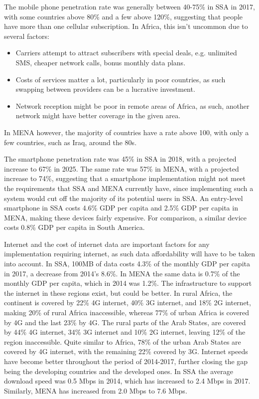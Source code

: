 \documentclass[11pt, a4paper]{article}
\begin{document}
\noindent The mobile phone penetration rate was generally between 40-75\% in SSA in 2017, with some countries above 80\% and a few above 120\%\cite{owidinternet}, suggesting that people have more than one cellular subscription. In Africa, this isn't uncommon due to several factors:
\begin{itemize}
    \item Carriers attempt to attract subscribers with special deals, e.g. unlimited SMS, cheaper network calls, bonus monthly data plans\cite{arwhy}.
    \item Costs of services matter a lot, particularly in poor countries, as such swapping between providers can be a lucrative investment\cite{arwhy}.
    \item Network reception might be poor in remote areas of Africa, as such, another network might have better coverage in the given area\cite{arwhy}.
\end{itemize}
In MENA however, the majority of countries have a rate above 100, with only a few countries, such as Iraq, around the 80s.

 The smartphone penetration rate was 45\% in SSA in 2018, with a projected increase to 67\% in 2025. The same rate was 57\% in MENA, with a projected increase to 74\%\cite{gsmame}, suggesting that a smartphone implementation might not meet the requirements that SSA and MENA currently have, since implementing such a system would cut off the majority of its potential users in SSA. An entry-level smartphone in SSA costs 4.6\% GDP per capita and 2.5\% GDP per capita in MENA, making these devices fairly expensive. For comparison, a similar device costs 0.8\% GDP per capita in South America\cite{gsma}.

Internet and the cost of internet data are important factors for any implementation requiring internet, as such data affordability will have to be taken into account. In SSA, 100MB of data costs 4.3\% of the monthly GDP per capita in 2017, a decrease from 2014's 8.6\%. In MENA the same data is 0.7\% of the monthly GDP per capita, which in 2014 was 1.2\%\cite{gsma}. The infrastructure to support the internet in these regions exist, but could be better. In rural Africa, the continent is covered by 22\% 4G internet, 40\% 3G internet, and 18\% 2G internet, making 20\% of rural Africa inaccessible, whereas 77\% of urban Africa is covered by 4G and the last 23\% by 4G. The rural parts of the Arab States, are covered by 44\% 4G internet, 34\% 3G internet and 10\% 2G internet, leaving 12\% of the region inaccessible. Quite similar to Africa, 78\% of the urban Arab States are covered by 4G internet, with the remaining 22\% covered by 3G\cite{ituinternet}. Internet speeds have become better throughout the period of 2014-2017, further closing the gap being the developing countries and the developed ones. In SSA the average download speed was 0.5 Mbps in 2014, which has increased to 2.4 Mbps in 2017. Similarly, MENA has increased from 2.0 Mbps to 7.6 Mbps\cite{gsma}.
\end{document}
